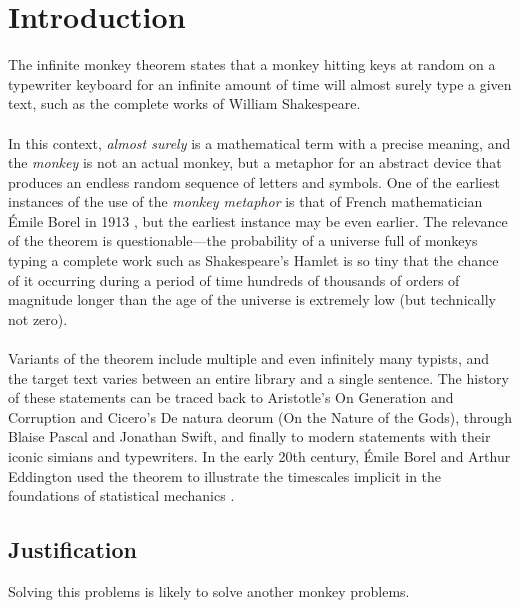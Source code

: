 \chapter{Introduction} \label{introduction}

The infinite monkey theorem states that a monkey hitting keys at random on a typewriter keyboard for an infinite amount of time will almost surely type a given text, such as the complete works of William Shakespeare.
\\
\\
In this context, \textit{almost surely} is a mathematical term with a precise meaning, and the \textit{monkey} is not an actual monkey, but a metaphor for an abstract device that produces an endless random sequence of letters and symbols. One of the earliest instances of the use of the \textit{monkey metaphor} is that of French mathematician Émile Borel in 1913 \cite{borel1913mecanique}, but the earliest instance may be even earlier. The relevance of the theorem is questionable—the probability of a universe full of monkeys typing a complete work such as Shakespeare's Hamlet is so tiny that the chance of it occurring during a period of time hundreds of thousands of orders of magnitude longer than the age of the universe is extremely low (but technically not zero).
\\
\\
Variants of the theorem include multiple and even infinitely many typists, and the target text varies between an entire library and a single sentence. The history of these statements can be traced back to Aristotle's On Generation and Corruption and Cicero's De natura deorum (On the Nature of the Gods), through Blaise Pascal and Jonathan Swift, and finally to modern statements with their iconic simians and typewriters. In the early 20th century, Émile Borel and Arthur Eddington used the theorem to illustrate the timescales implicit in the foundations of statistical mechanics \cite{wikiMonkeys}.


\section{Justification} \label{justification}

Solving this problems is likely to solve another monkey problems.

